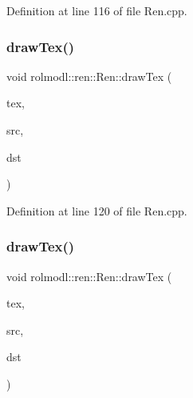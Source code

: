 Definition at line 116 of file Ren.\+cpp.

\mbox{\label{classrolmodl_1_1blend_mode_1_1_ren_ae04a366c6e65610789172ce3529453e4}} 
\subsubsection{\texorpdfstring{drawTex()}{drawTex()}\hspace{0.1cm}{\footnotesize\ttfamily [6/36]}}
{\footnotesize\ttfamily void rolmodl\+::ren\+::\+Ren\+::draw\+Tex (\begin{DoxyParamCaption}\item[{Tex \&}]{tex,  }\item[{const \mbox{\hyperlink{structrolmodl_1_1blend_mode_1_1_src_rect_w_h}{Src\+Rect\+WH}}}]{src,  }\item[{const \mbox{\hyperlink{structrolmodl_1_1blend_mode_1_1_dst_rect_w_h}{Dst\+Rect\+WH}}}]{dst }\end{DoxyParamCaption})}



Definition at line 120 of file Ren.\+cpp.

\mbox{\label{classrolmodl_1_1blend_mode_1_1_ren_a47147eb4c0a0ad1b00008651586734a7}} 
\subsubsection{\texorpdfstring{drawTex()}{drawTex()}\hspace{0.1cm}{\footnotesize\ttfamily [7/36]}}
{\footnotesize\ttfamily void rolmodl\+::ren\+::\+Ren\+::draw\+Tex (\begin{DoxyParamCaption}\item[{Tex \&}]{tex,  }\item[{const \mbox{\hyperlink{structrolmodl_1_1blend_mode_1_1_src_rect_w_h}{Src\+Rect\+WH}}}]{src,  }\item[{const \mbox{\hyperlink{structrolmodl_1_1blend_mode_1_1_dst_rect_x_y}{Dst\+Rect\+XY}}}]{dst }\end{DoxyParamCaption})}



